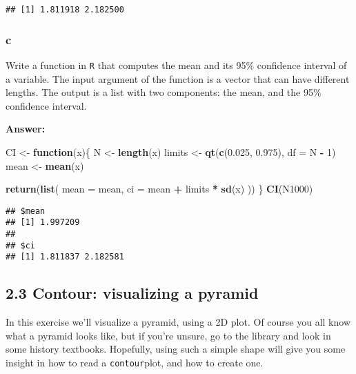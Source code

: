 \documentclass[]{article}
\newenvironment{Shaded}{\begin{snugshade}}{\end{snugshade}}
\newcommand{\ControlFlowTok}[1]{\textcolor[rgb]{0.13,0.29,0.53}{\textbf{#1}}}
\newcommand{\DataTypeTok}[1]{\textcolor[rgb]{0.13,0.29,0.53}{#1}}
\newcommand{\DecValTok}[1]{\textcolor[rgb]{0.00,0.00,0.81}{#1}}
\newcommand{\FloatTok}[1]{\textcolor[rgb]{0.00,0.00,0.81}{#1}}
\newcommand{\KeywordTok}[1]{\textcolor[rgb]{0.13,0.29,0.53}{\textbf{#1}}}
\newcommand{\NormalTok}[1]{#1}
\newcommand{\OperatorTok}[1]{\textcolor[rgb]{0.81,0.36,0.00}{\textbf{#1}}}
\newcommand{\StringTok}[1]{\textcolor[rgb]{0.31,0.60,0.02}{#1}}
\begin{document}
\begin{verbatim}
## [1] 1.811918 2.182500
\end{verbatim}

\hypertarget{c-7}{%
\subsubsection{c}\label{c-7}}

Write a function in \texttt{R} that computes the mean and its 95\(\%\)
confidence interval of a variable. The input argument of the function is
a vector that can have different lengths. The output is a list with two
components: the mean, and the 95\(\%\) confidence interval.

\textbf{Answer:}

\begin{Shaded}
\begin{Highlighting}[]
\NormalTok{CI <-}\StringTok{ }\ControlFlowTok{function}\NormalTok{(x)\{}
\NormalTok{  N <-}\StringTok{ }\KeywordTok{length}\NormalTok{(x)}
\NormalTok{  limits <-}\StringTok{ }\KeywordTok{qt}\NormalTok{(}\KeywordTok{c}\NormalTok{(}\FloatTok{0.025}\NormalTok{, }\FloatTok{0.975}\NormalTok{), }\DataTypeTok{df =}\NormalTok{ N }\OperatorTok{-}\StringTok{ }\DecValTok{1}\NormalTok{)}
\NormalTok{  mean <-}\StringTok{ }\KeywordTok{mean}\NormalTok{(x)}
  
  \KeywordTok{return}\NormalTok{(}\KeywordTok{list}\NormalTok{(}
    \DataTypeTok{mean =}\NormalTok{ mean, }
    \DataTypeTok{ci =}\NormalTok{ mean }\OperatorTok{+}\StringTok{ }\NormalTok{limits }\OperatorTok{*}\StringTok{ }\KeywordTok{sd}\NormalTok{(x)}
\NormalTok{  ))}
\NormalTok{\}}
\KeywordTok{CI}\NormalTok{(N1000)}
\end{Highlighting}
\end{Shaded}

\begin{verbatim}
## $mean
## [1] 1.997209
## 
## $ci
## [1] 1.811837 2.182581
\end{verbatim}

\hypertarget{contour-visualizing-a-pyramid}{%
\subsection{2.3 Contour: visualizing a
pyramid}\label{contour-visualizing-a-pyramid}}

In this exercise we'll visualize a pyramid, using a 2D plot. Of course
you all know what a pyramid looks like, but if you're unsure, go to the
library and look in some history textbooks. Hopefully, using such a
simple shape will give you some insight in how to read a
\texttt{contour}plot, and how to create one.
\end{document}
